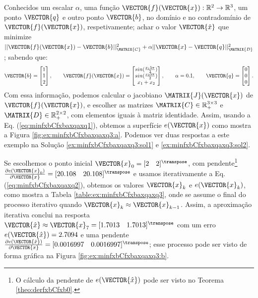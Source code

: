 \begin{example}
\label{ex:minfxbCfxbaxqaxq1}
Conhecidos um escalar $\alpha$, uma função $\VECTOR{f}(\VECTOR{x}) : \mathbb{R}^{2} \rightarrow \mathbb{R}^{3}$,
um ponto $\VECTOR{q}$
e outro ponto $\VECTOR{b}$, no domínio e no contradomínio de $\VECTOR{f}(\VECTOR{x})$, respetivamente;
achar o valor $\VECTOR{\hat{x}}$ que minimize 
$||\VECTOR{f}(\VECTOR{x})-\VECTOR{b}||_{\MATRIX{C}}^2+\alpha||\VECTOR{x}-\VECTOR{q}||_{\MATRIX{D}}^2$;
sabendo que:
\begin{equation}
\VECTOR{b}=\begin{bmatrix}
1\\
1\\
2
\end{bmatrix},
\qquad 
\VECTOR{f}(\VECTOR{x})=\begin{bmatrix}
sin(\frac{x_1 5 \pi}{2})\\
sin(\frac{x_2 5 \pi}{2})\\
x_1+x_2
\end{bmatrix},
\qquad
\alpha=0.1,
\qquad
\VECTOR{q}=\begin{bmatrix}
0\\
0\\
0
\end{bmatrix}.
\end{equation}
Com essa informação, podemos calcular o jacobiano $\MATRIX{J}(\VECTOR{x})$ de $\VECTOR{f}(\VECTOR{x})$,
 e escolher as matrizes $\MATRIX{C} \in \mathbb{R}^{3\times 3}_{+}$ e $\MATRIX{D} \in \mathbb{R}^{2\times 2}_{+}$, 
com elementos iguais à  matriz identidade. 
Assim, usando a Eq. (\ref{eq:minfxbCfxbaxqaxq1}),
obtemos a superfície $e(\VECTOR{x})$ como mostra a Figura \ref{fig:ex:minfxbCfxbaxqaxq3:a}.
Podemos ver duas respostas a este exemplo na Solução \ref{ex:minfxbCfxbaxqaxq3:sol1} e \ref{ex:minfxbCfxbaxqaxq3:sol2}.
\end{example}

\begin{SolutionT}
\label{ex:minfxbCfxbaxqaxq3:sol1}
Se escolhemos o ponto inicial $\VECTOR{x}_0=[2\quad 2]^{\transpose}$,
com pendente\footnote{O cálculo da
pendente de $e(\VECTOR{\hat{x}})$ pode ser visto no Teorema \ref{theo:derfxbCfxb0}.} 
$\frac{\partial e(\VECTOR{x}_0)}{\partial \VECTOR{x} }=[20.108\quad 20.108]^{\transpose}$ e 
usamos iterativamente a Eq. (\ref{eq:minfxbCfxbaxqaxq2}), obtemos os valores 
$\VECTOR{x}_k$ e $e(\VECTOR{x}_k)$, como mostra a Tabela \ref{table:ex:minfxbCfxbaxqaxq3},
onde se assume o final do processo iterativo quando $\VECTOR{x}_k \approx \VECTOR{x}_{k-1}$.
Assim, a aproximação iterativa conclui na resposta 
$\VECTOR{\hat{x}}\approx \VECTOR{x}_{7} =[1.7013\quad 1.7013]^{\transpose}$
com um erro $e(\VECTOR{\hat{x}})=2.7094$ e uma pendente
$\frac{\partial e(\VECTOR{\hat{x}})}{\partial \VECTOR{x} }=[0.0016997\quad 0.0016997]^{\transpose}$;
esse processo pode ser visto de forma gráfica na Figura \ref{fig:ex:minfxbCfxbaxqaxq3:b}.
\end{SolutionT}

